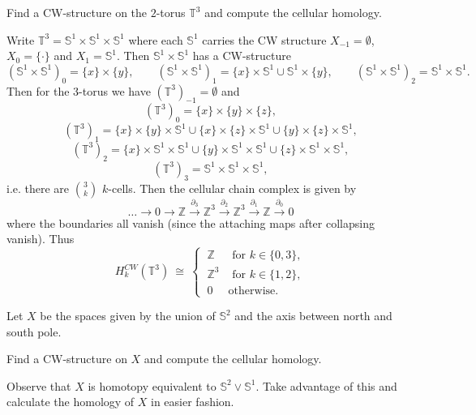 \documentclass[11pt]{book}
\numberwithin{dummy}{section}
\theoremstyle{nonumberbreak}
\newenvironment{sol}[1][]{\ifthenelse{\equal{#1}{}}{\solution}{\solution[#1]}\rm}{\endsolution}
\newenvironment{prob}[1][]{\ifthenelse{\equal{#1}{}}{\problem}{\problem[#1]}\rm}{\endproblem}
\newcommand{\Sph}{\mathbb{S}}
\newcommand{\la}{\longrightarrow}
\newcommand{\Z}{\mathbb{Z}}
\begin{document}
\begin{spacing}{1.4}
\begin{prob}    %
Find a CW-structure on the $2$-torus $\mathbb{T}^3$ and compute the cellular homology.

\begin{sol}
Write $\mathbb{T}^3 = \Sph^1 \times \Sph^1 \times \Sph^1$ where each $\Sph^1$ carries the CW structure $X_{-1}=\emptyset$, $X_0= \{\cdot\}$ and $X_1=\Sph^1$. Then $\Sph^1 \times \Sph^1$ has a CW-structure
$$(\Sph^1 \times \Sph^1)_0=\{x\} \times \{y\}, \qquad (\Sph^1 \times \Sph^1)_1 = \{x\} \times \Sph^1 \cup \Sph^1 \times \{y\}, \qquad (\Sph^1 \times \Sph^1)_2= \Sph^1 \times \Sph^1.$$
Then for the $3$-torus we have $(\mathbb{T}^3)_{-1}=\emptyset$ and 
$$(\mathbb{T}^3)_0=\{x\} \times \{y\} \times \{z\},$$
$$(\mathbb{T}^3)_1=\{x\} \times \{y\} \times \Sph^{1} \cup \{x\} \times \{z\} \times \Sph^{1} \cup \{y\} \times \{z\} \times \Sph^{1},$$
$$(\mathbb{T}^3)_2= \{x\} \times \Sph^1 \times \Sph^1 \cup \{y\} \times \Sph^1 \times \Sph^1 \cup \{z\} \times \Sph^1 \times \Sph^1,$$
$$(\mathbb{T}^3)_3=\Sph^1 \times \Sph^1 \times \Sph^1,$$
i.e. there are $\binom{3}{k}$ $k$-cells. Then the cellular chain complex is given by 
$$ \ldots \la 0 \la \Z \overset{\partial_3}{\la} \Z^3 \overset{\partial_2}{\la} \Z^3 \overset{\partial_1}{\la} \Z \overset{\partial_0}{\la} 0$$
where the boundaries all vanish (since the attaching maps after collapsing vanish). Thus 
$$H_k^{CW}(\mathbb{T}^3) \ \cong \ \begin{cases} \ \Z & \textrm{ for } k \in \{0,3\}, \\ \ \Z^3 & \textrm{ for } k \in \{1,2\},\\ \ 0 & \textrm{otherwise.} \end{cases} $$
\end{sol}


\end{prob}




\begin{prob} %
Let $X$ be the spaces given by the union of $\Sph^2$ and the axis between north and south pole.
\begin{compactenum}
\item Find a CW-structure on $X$ and compute the cellular homology.
\item Observe that $X$ is homotopy equivalent to $\Sph^2 \vee \Sph^1$. Take advantage of this and calculate the homology of $X$ in easier fashion.
\end{compactenum}
\end{prob}



\end{spacing}
\end{document}
